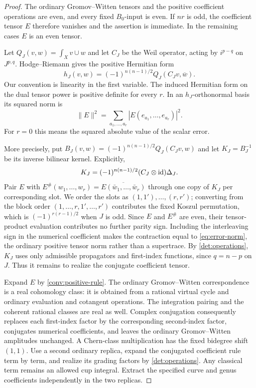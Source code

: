 \begin{proof}
The ordinary Gromov--Witten tensors and the positive coefficient operations are even, and every fixed \(B_0\)-input is even. If \(nr\) is odd, the coefficient tensor \(E\) therefore vanishes and the assertion is immediate. In the remaining cases \(E\) is an even tensor.

Let \(Q_J(v,w)=\int_Xv\cup w\) and let \(C_J\) be the Weil operator, acting by \(i^{p-q}\) on \(J^{p,q}\). Hodge--Riemann gives the positive Hermitian form
\begin{equation}\label{eq:primitive-hermitian}
 h_J(v,w)=(-1)^{n(n-1)/2}Q_J(C_Jv,\overline w).
\end{equation}
Our convention is linearity in the first variable. The induced Hermitian form on the dual tensor power is positive definite for every \(r\). In an \(h_J\)-orthonormal basis its squared norm is
\begin{equation}\label{eq:error-norm}
 \|E\|^2=\sum_{a_1,\ldots,a_r}
       \left|E(e_{a_1},\ldots,e_{a_r})\right|^2.
\end{equation}
For \(r=0\) this means the squared absolute value of the scalar error.

More precisely, put \(B_J(v,w)=(-1)^{n(n-1)/2}Q_J(C_Jv,w)\) and let \(K_J=B_J^{-1}\) be its inverse bilinear kernel. Explicitly,
\[
 K_J=(-1)^{n(n-1)/2}(C_J\otimes\mathrm{id})\Delta_J.
\]
Pair \(E\) with \(E^\#(w_1,\ldots,w_r)=\overline{E(\bar w_1,\ldots,\bar w_r)}\) through one copy of \(K_J\) per corresponding slot. We order the slots as \((1,1'),\ldots,(r,r')\); converting from the block order \((1,\ldots,r,1',\ldots,r')\) contributes the fixed Koszul permutation, which is \((-1)^{r(r-1)/2}\) when \(J\) is odd. Since \(E\) and \(E^\#\) are even, their tensor-product evaluation contributes no further parity sign. Including the interleaving sign in the numerical coefficient makes the contraction equal to \eqref{eq:error-norm}, the ordinary positive tensor norm rather than a supertrace. By \cref{det:operations}, \(K_J\) uses only admissible propagators and first-index functions, since \(q=n-p\) on \(J\). Thus it remains to realize the conjugate coefficient tensor.

Expand \(E\) by \cref{conv:positive-rule}. The ordinary Gromov--Witten correspondence is a real cohomology class: it is obtained from a rational virtual cycle and ordinary evaluation and cotangent operations. The integration pairing and the coherent rational classes are real as well. Complex conjugation consequently replaces each first-index factor by the corresponding second-index factor, conjugates numerical coefficients, and leaves the ordinary Gromov--Witten amplitudes unchanged. A Chern-class multiplication has the fixed bidegree shift \((1,1)\). Use a second ordinary replica, expand the conjugated coefficient rule term by term, and realize its grading factors by \cref{det:operations}. Any classical term remains an allowed cup integral. Extract the specified curve and genus coefficients independently in the two replicas.


\end{proof}
